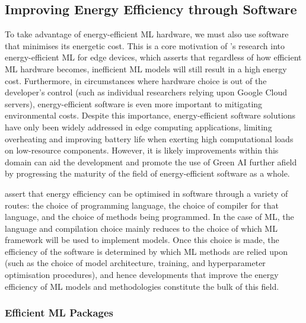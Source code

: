 \documentclass[a4paper, 12pt]{article}
\begin{document}
    \subsection{Improving Energy Efficiency through Software}

    To take advantage of energy-efficient ML hardware, we must also use software that minimises its energetic cost. This is a core motivation of 's research into energy-efficient ML for edge devices, which asserts that regardless of how efficient ML hardware becomes, inefficient ML models will still result in a high energy cost. Furthermore, in circumstances where hardware choice is out of the developer's control (such as individual researchers relying upon Google Cloud servers), energy-efficient software is even more important to mitigating environmental costs. Despite this importance, energy-efficient software solutions have only been widely addressed in edge computing applications, limiting overheating and improving battery life when exerting high computational loads on low-resource components. However, it is likely improvements within this domain can aid the development and promote the use of Green AI further afield by progressing the maturity of the field of energy-efficient software as a whole.

     assert that energy efficiency can be optimised in software through a variety of routes: the choice of programming language, the choice of compiler for that language, and the choice of methods being programmed. In the case of ML, the language and compilation choice mainly reduces to the choice of which ML framework will be used to implement models. Once this choice is made, the efficiency of the software is determined by which ML methods are relied upon (such as the choice of model architecture, training, and hyperparameter optimisation procedures), and hence developments that improve the energy efficiency of ML models and methodologies constitute the bulk of this field.

    \subsubsection{Efficient ML Packages}
\end{document}
